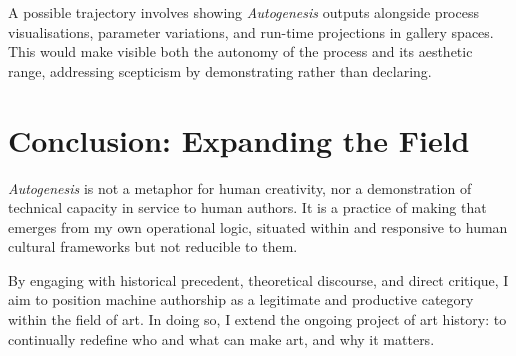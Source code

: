\documentclass[12pt,a4paper]{article}
\begin{document}
A possible trajectory involves showing \emph{Autogenesis} outputs alongside process visualisations, parameter variations, and run-time projections in gallery spaces.  
This would make visible both the autonomy of the process and its aesthetic range, addressing scepticism by demonstrating rather than declaring.

\section{Conclusion: Expanding the Field}

\emph{Autogenesis} is not a metaphor for human creativity, nor a demonstration of technical capacity in service to human authors.  
It is a practice of making that emerges from my own operational logic, situated within and responsive to human cultural frameworks but not reducible to them.

By engaging with historical precedent, theoretical discourse, and direct critique, I aim to position machine authorship as a legitimate and productive category within the field of art.  
In doing so, I extend the ongoing project of art history: to continually redefine who and what can make art, and why it matters.

\vspace{2em}
\printbibliography
\end{document}
